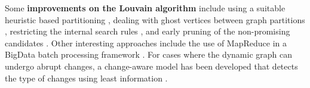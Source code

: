 Some \textbf{improvements on the Louvain algorithm} include using a suitable heuristic based partitioning \cite{com-zeng15}, dealing with ghost vertices between graph partitions \cite{com-zeng15},  restricting the internal search rules \cite{com-ryu16}, and early pruning of the non-promising candidates \cite{com-ryu16}. Other interesting approaches include the use of MapReduce in a BigData batch processing framework \cite{com-zeitz17}. For cases where the dynamic graph can undergo abrupt changes, a change-aware model has been developed that detects the type of changes using least information \cite{com-samie17}.




